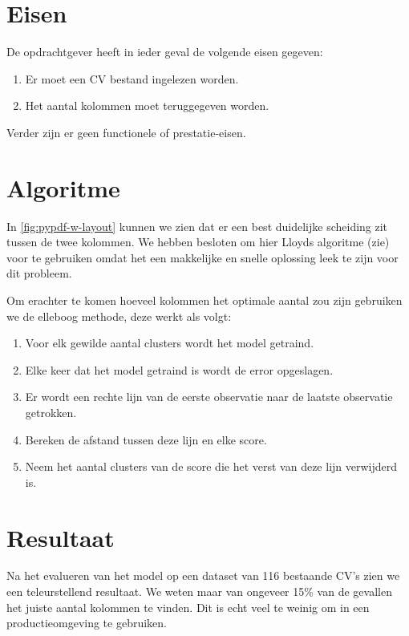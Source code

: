 \documentclass{article}
\begin{document}
\section{Eisen}

De opdrachtgever heeft in ieder geval de volgende eisen gegeven:

\begin{enumerate}
    \item Er moet een CV bestand ingelezen worden.
    \item Het aantal kolommen moet teruggegeven worden.
\end{enumerate}

Verder zijn er geen functionele of prestatie-eisen.

\section{Algoritme}

In \ref{fig:pypdf-w-layout} kunnen we zien dat er een best duidelijke scheiding
zit tussen de twee kolommen. We hebben besloten om hier Lloyds algoritme
(zie\cite{lloyd-1982}) voor te gebruiken omdat het een makkelijke en snelle
oplossing leek te zijn voor dit probleem.

Om erachter te komen hoeveel kolommen het optimale aantal zou zijn gebruiken we
de elleboog methode, deze werkt als volgt\cite{ropensci-no-date}:

\begin{enumerate}
    \item Voor elk gewilde aantal clusters wordt het model getraind.
    \item Elke keer dat het model getraind is wordt de error opgeslagen.
    \item Er wordt een rechte lijn van de eerste observatie naar de laatste
          observatie getrokken.
    \item Bereken de afstand tussen deze lijn en elke score.
    \item Neem het aantal clusters van de score die het verst van deze lijn
          verwijderd is.
\end{enumerate}

\section{Resultaat}

Na het evalueren van het model op een dataset van 116 bestaande CV's zien we een
teleurstellend resultaat. We weten maar van ongeveer 15\% van de gevallen het
juiste aantal kolommen te vinden. Dit is echt veel te weinig om in een
productieomgeving te gebruiken.
\end{document}
